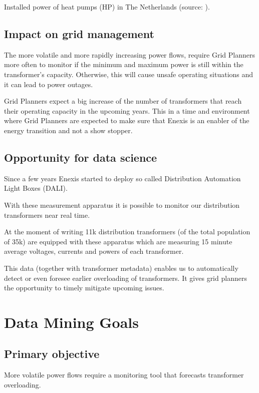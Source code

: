 \documentclass[letterpaper,10pt,english]{sphinxmanual}
\begin{document}
Installed power of heat pumps (HP) in The Netherlands (source: ).


\subsection{Impact on grid management}
\label{\detokenize{business_understanding:impact-on-grid-management}}
The more volatile and more rapidly increasing power flows, require Grid Planners more often to monitor if the minimum and maximum power is still within the transformer’s capacity.
Otherwise, this will cause unsafe operating situations and it can lead to power outages.

Grid Planners expect a big increase of the number of transformers that reach their operating capacity in the upcoming years.
This in a time and environment where Grid Planners are expected to make sure that Enexis is an enabler of the energy transition and not a show stopper.


\subsection{Opportunity for data science}
\label{\detokenize{business_understanding:opportunity-for-data-science}}
Since a few years Enexis started to deploy so called Distribution Automation Light Boxes (DALI).

With these measurement apparatus it is possible to monitor our distribution transformers near real time.

At the moment of writing 11k distribution transformers (of the total population of 35k) are equipped with these apparatus which are measuring 15 minute average voltages, currents and powers of each transformer.

This data (together with transformer metadata) enables us to automatically detect or even foresee earlier overloading of transformers.
It gives grid planners the opportunity to timely mitigate upcoming issues.


\section{Data Mining Goals}
\label{\detokenize{business_understanding:data-mining-goals}}

\subsection{Primary objective}
\label{\detokenize{business_understanding:primary-objective}}
More volatile power flows require a monitoring tool that forecasts transformer overloading.
\end{document}

